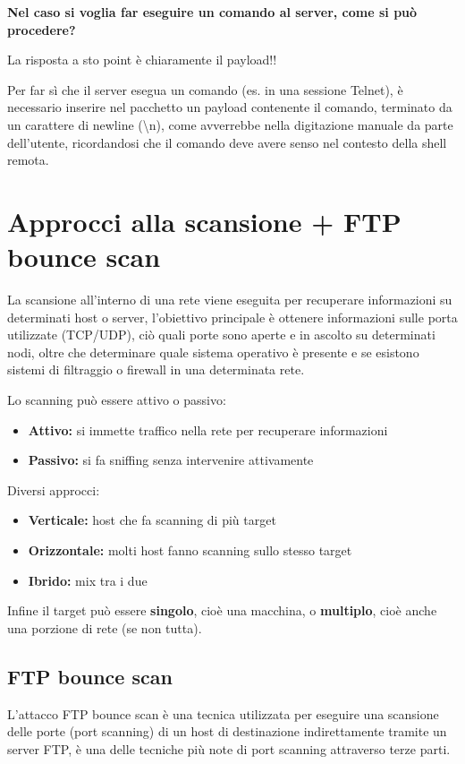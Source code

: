 \documentclass{report}
\begin{document}
\begin{center}
    \textbf{Nel caso si voglia far eseguire un comando al server, come si può procedere?}
\end{center}
\noindent La risposta a sto point è chiaramente il payload!!

\noindent Per far sì che il server esegua un comando (es. in una sessione Telnet), è necessario
inserire nel pacchetto un payload contenente il comando, terminato da un carattere di newline (\textbackslash n), come avverrebbe nella digitazione manuale da parte dell'utente,
ricordandosi che il comando deve avere senso nel contesto della shell remota.






\section{Approcci alla scansione + FTP bounce scan}
\noindent La scansione all'interno di una rete viene eseguita per recuperare informazioni su determinati host o server, l'obiettivo principale è ottenere informazioni
sulle porta utilizzate (TCP/UDP), ciò quali porte sono aperte e in ascolto su determinati nodi, oltre che determinare quale sistema operativo è presente e se esistono sistemi di filtraggio o 
firewall in una determinata rete.

\noindent Lo scanning può essere attivo o passivo:
\begin{itemize}
    \item \textbf{Attivo:} si immette traffico nella rete per recuperare informazioni
    \item \textbf{Passivo:} si fa sniffing senza intervenire attivamente
\end{itemize}

\noindent Diversi approcci:
\begin{itemize}
    \item \textbf{Verticale:} host che fa scanning di più target 
    \item \textbf{Orizzontale:} molti host fanno scanning sullo stesso target 
    \item \textbf{Ibrido:} mix tra i due
\end{itemize}

\noindent Infine il target può essere \textbf{singolo}, cioè una macchina, o \textbf{multiplo}, cioè anche una porzione di rete (se non tutta).

\subsection{FTP bounce scan}
L'attacco FTP bounce scan è una tecnica utilizzata per eseguire una scansione delle porte (port scanning) di un host di destinazione indirettamente tramite un server FTP, è una delle tecniche più note di port scanning attraverso terze parti.
\end{document}
